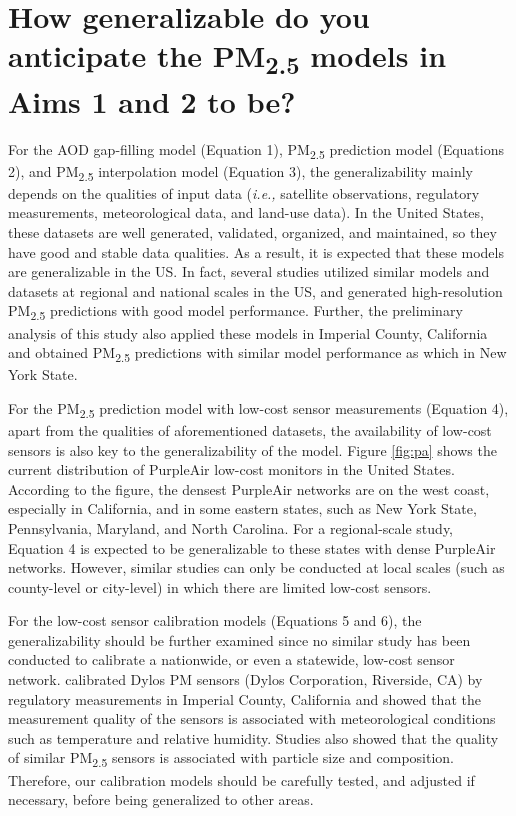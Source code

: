 \documentclass[11pt]{article}
\newcommand{\tsub}{\textsubscript}
\begin{document}
\section{How generalizable do you anticipate the \texorpdfstring{PM\tsub{2.5}}{PM2.5} models in Aims 1 and 2 to be?}
\begin{enumerate*}[{[a)]}]
    \item For the AOD gap-filling model (Equation 1), PM\tsub{2.5} prediction model (Equations 2), and PM\tsub{2.5} interpolation model (Equation 3), the generalizability mainly depends on the qualities of input data (\textit{i.e.,} satellite observations, regulatory measurements, meteorological data, and land-use data). In the United States, these datasets are well generated, validated, organized, and maintained, so they have good and stable data qualities. As a result, it is expected that these models are generalizable in the US. In fact, several studies \citep{kloog2011assessing, kloog2012incorporating, hu2017estimating, di2016assessing} utilized similar models and datasets at regional and national scales in the US, and generated high-resolution PM\tsub{2.5} predictions with good model performance. Further, the preliminary analysis of this study also applied these models in Imperial County, California and obtained PM\tsub{2.5} predictions with similar model performance as which in New York State. 
    
    For the PM\tsub{2.5} prediction model with low-cost sensor measurements (Equation 4), apart from the qualities of aforementioned datasets, the availability of low-cost sensors is also key to the generalizability of the model. Figure \ref{fig:pa} shows the current distribution of PurpleAir low-cost monitors in the United States. According to the figure, the densest PurpleAir networks are on the west coast, especially in California, and in some eastern states, such as New York State, Pennsylvania, Maryland, and North Carolina. For a regional-scale study, Equation 4 is expected to be generalizable to these states with dense PurpleAir networks. However, similar studies can only be conducted at local scales (such as county-level or city-level) in which there are limited low-cost sensors. 
    
    For the low-cost sensor calibration models (Equations 5 and 6), the generalizability should be further examined since no similar study has been conducted to calibrate a nationwide, or even a statewide, low-cost sensor network. \citet{carvlin2017development} calibrated Dylos PM sensors (Dylos Corporation, Riverside, CA) by regulatory measurements in Imperial County, California and showed that the measurement quality of the sensors is associated with meteorological conditions such as temperature and relative humidity. Studies \citep{broday2017wireless, castell2017can} also showed that the quality of similar PM\tsub{2.5} sensors is associated with particle size and composition. Therefore, our calibration models should be carefully tested, and adjusted if necessary, before being generalized to other areas. 
    

\end{enumerate*}
\end{document}

